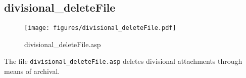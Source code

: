 \subsection{divisional\_deleteFile}
\begin{figure}[htb]
    \begin{center}
        \texttt{[image: figures/divisional\_deleteFile.pdf]}
    \end{center}
    \caption{divisional\_deleteFile.asp}
    \label{fig:divisional_deleteFile}
\end{figure}

The file \verb|divisional_deleteFile.asp| deletes divisional attachments through
means of archival.
